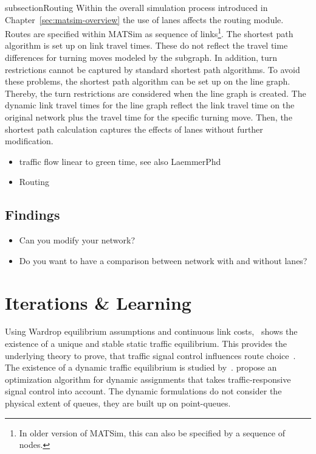 subsection{Routing}
Within the overall simulation process introduced in Chapter~\ref{sec:matsim-overview} the use of lanes affects the routing module. 
Routes are specified within MATSim as sequence of links\footnote{In older version of MATSim, this can also be specified by a sequence of nodes.}.  
The shortest path algorithm is set up on link travel times. 
These do not reflect the travel time differences for turning moves modeled by the subgraph. 
In addition, turn restrictions cannot be captured by standard shortest path algorithms. 
To avoid these problems, the shortest path algorithm can be set up on the line graph. 
Thereby, the turn restrictions are considered when the line graph is created. 
The dynamic link travel times for the line graph reflect the link travel time on the original network plus the travel time for the specific turning move. 
Then, the shortest path calculation captures the effects of lanes without further modification. 


\begin{itemize}
	\item traffic flow linear to green time, see also LaemmerPhd
	\item Routing
\end{itemize}

\subsection{Findings}

\begin{itemize}
	\item Can you modify your network?
	\item Do you want to have a comparison between network with and without lanes?
\end{itemize}




\section{Iterations \& Learning}
\label{sec:signals_iterations_learning}


Using Wardrop equilibrium assumptions and continuous link costs,~\citet{Smith1979ExistenceUniquenessStabilityEquilibria} shows the existence of a unique and stable static traffic equilibrium. 
This provides the underlying theory to prove, that traffic signal control influences route choice~\citep{Smith1979TrafficControlRouteChoice}. 
The existence of a dynamic traffic equilibrium is studied by~\citet{Smith1993ModelDynamicUE}. 
\citet{SmithVanVuren1993TrafficEquilibriumResponsiveControl} propose an optimization algorithm for dynamic assignments that takes traffic-responsive signal control into account.  
The dynamic formulations do not consider the physical extent of queues, they are built up on point-queues. 

